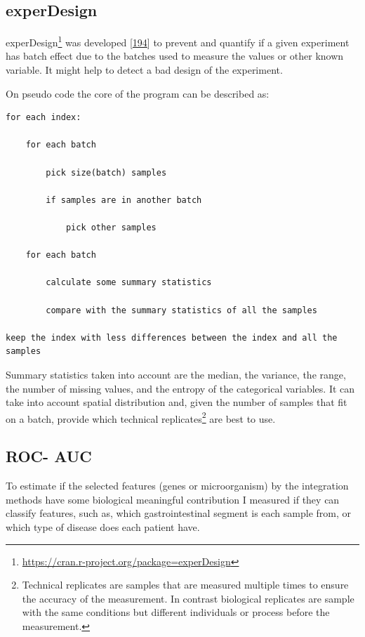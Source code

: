\documentclass[
  a4paper,
]{book}
\DeclareRobustCommand{\href}[2]{#2\footnote{\url{#1}}}
\begin{document}
\hypertarget{experdesign}{%
\subsection{experDesign}\label{experdesign}}

\href{https://cran.r-project.org/package=experDesign}{experDesign} was developed {[}\protect\hyperlink{ref-revillasancho2021}{194}{]} to prevent and quantify if a given experiment has batch effect due to the batches used to measure the values or other known variable.
It might help to detect a bad design of the experiment.

On pseudo code the core of the program can be described as:

\hypertarget{pseudocode-experDesign}{%
\label{pseudocode-experDesign}}%
\begin{verbatim}
for each index:

    for each batch

        pick size(batch) samples

        if samples are in another batch

            pick other samples

    for each batch

        calculate some summary statistics

        compare with the summary statistics of all the samples

keep the index with less differences between the index and all the samples
\end{verbatim}

Summary statistics taken into account are the median, the variance, the range, the number of missing values, and the entropy of the categorical variables.
It can take into account spatial distribution and, given the number of samples that fit on a batch, provide which technical replicates\footnote{Technical replicates are samples that are measured multiple times to ensure the accuracy of the measurement.
  In contrast biological replicates are sample with the same conditions but different individuals or process before the measurement.} are best to use.

\hypertarget{ROC}{%
\subsection{ROC- AUC}\label{ROC}}

To estimate if the selected features (genes or microorganism) by the integration methods have some biological meaningful contribution I measured if they can classify features, such as, which gastrointestinal segment is each sample from, or which type of disease does each patient have.
\end{document}
